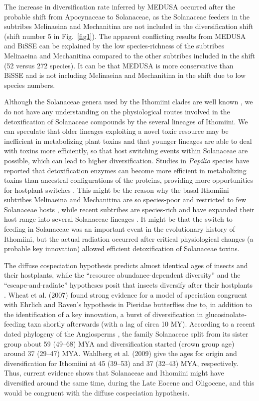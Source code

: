 \documentclass[10pt,letterpaper]{article}
\begin{document}
The increase in diversification rate inferred by MEDUSA occurred after the
probable shift from Apocynaceae to Solanaceae, as the Solanaceae feeders
in the subtribes Melinaeina and Mechanitina are not included in the
diversification shift (shift number 5 in Fig.~\ref{fig1}). The apparent
conflicting results from MEDUSA and BiSSE can be explained by the low
species-richness of the subtribes Melinaeina and Mechanitina compared to
the other subtribes included in the shift (52 versus 272 species). It
can be that MEDUSA is more conservative than BiSSE and is not including
Melinaeina and Mechanitina in the shift due to low species numbers.

Although the Solanaceae genera used by the Ithomiini clades are well
known \cite{willmott2006}, we do not have any understanding on the physiological
routes involved in the detoxification of Solanaceae compounds by the
several lineages of Ithomiini. We can speculate that older lineages
exploiting a novel toxic resource \cite{willmott2006, wahlberg2009} 
may be inefficient
in metabolizing plant toxins and that younger lineages are able to deal
with toxins more efficiently, so that host switching events within
Solanaceae are possible, which can lead to higher diversification.
Studies in \emph{Papilio} species have reported that detoxification
enzymes can become more efficient in metabolizing toxins than ancestral
configurations of the proteins, providing more opportunities for
hostplant switches \cite{li2003}. This might be the reason why the basal
Ithomiini subtribes Melinaeina and Mechanitina are so species-poor and
restricted to few Solanaceae hosts \cite{willmott2006}, while recent subtribes are
species-rich and have expanded their host range into several Solanaceae
lineages \cite{willmott2006}. It might be that the switch to feeding in Solanaceae
was an important event in the evolutionary history of Ithomiini, but the
actual radiation occurred after critical physiological changes (a
probable key innovation) allowed efficient detoxification of Solanaceae
toxins.

The diffuse cospeciation hypothesis predicts almost identical ages of
insects and their hostplants, while the ``resource abundance-dependent
diversity'' and the ``escape-and-radiate'' hypotheses posit that insects
diversify after their hostplants \cite{nyman2012, ehrlich1964, janz2011}.
Wheat et al. (2007)
\cite{wheat2007} found strong evidence for a model of speciation congruent with
Ehrlich and Raven's hypothesis in Pieridae butterflies due to, in
addition to the identification of a key innovation, a burst of
diversification in glucosinolate-feeding taxa shortly afterwards (with a
lag of circa 10 MY). According to a recent dated phylogeny of the
Angiosperms \cite{bell2010}, the family Solanaceae split from its sister group
about 59 (49--68) MYA and diversification started (crown group age)
around 37 (29--47) MYA. Wahlberg et al. (2009) \cite{wahlberg2009} give the ages
for origin and diversification for Ithomiini at 45 (39--53) and 37
(32--43) MYA, respectively. Thus, current evidence shows that Solanaceae
and Ithomiini might have diversified around the same time, during the
Late Eocene and Oligocene, and this would be congruent with the diffuse
cospeciation hypothesis.
\end{document}
